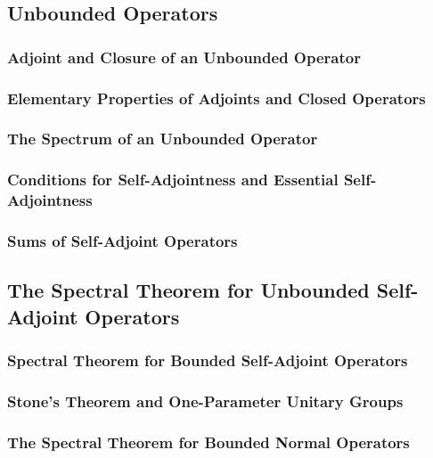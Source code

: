 \subsection{Unbounded Operators}

\subsubsection{Adjoint and Closure of an Unbounded Operator}

\subsubsection{Elementary Properties of Adjoints and Closed Operators}

\subsubsection{The Spectrum of an Unbounded Operator}

\subsubsection{Conditions for Self-Adjointness and Essential Self-Adjointness}

\subsubsection{Sums of Self-Adjoint Operators}


\subsection{The Spectral Theorem for Unbounded Self-Adjoint Operators}

\subsubsection{Spectral Theorem for Bounded Self-Adjoint Operators}

\subsubsection{Stone's Theorem and One-Parameter Unitary Groups}

\subsubsection{The Spectral Theorem for Bounded Normal Operators}
